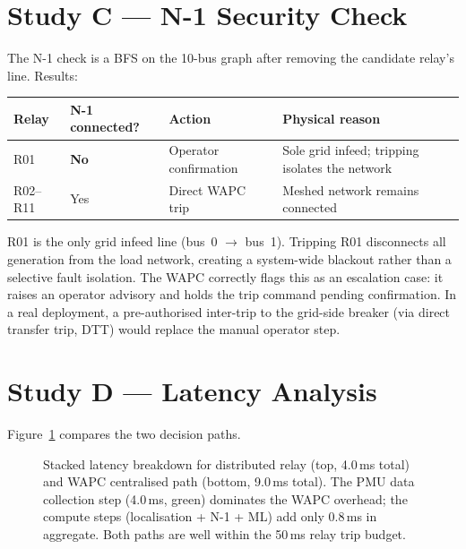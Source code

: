 \documentclass[11pt,a4paper]{article}
\begin{document}
\section{Study C --- N-1 Security Check}
\label{sec:studyC}

The N-1 check is a BFS on the 10-bus graph after removing the candidate
relay's line.  Results:

\begin{center}
\begin{tabular}{@{}llll@{}}
\toprule
Relay & N-1 connected? & Action & Physical reason \\
\midrule
R01 & \textbf{No} & Operator confirmation & Sole grid infeed; tripping isolates the network \\
R02--R11 & Yes & Direct WAPC trip & Meshed network remains connected \\
\bottomrule
\end{tabular}
\end{center}

\medskip\noindent
R01 is the only grid infeed line (bus~0 $\to$ bus~1).  Tripping R01 disconnects
all generation from the load network, creating a system-wide blackout rather
than a selective fault isolation.  The WAPC correctly flags this as an
escalation case: it raises an operator advisory and holds the trip command
pending confirmation.  In a real deployment, a pre-authorised inter-trip to
the grid-side breaker (via direct transfer trip, DTT) would replace the manual
operator step.

\section{Study D --- Latency Analysis}
\label{sec:studyD}

Figure~\ref{fig:latency} compares the two decision paths.

\begin{figure}[htbp]
  \centering
  \resizebox{0.96\textwidth}{!}{}
  \caption{Stacked latency breakdown for distributed relay (top, 4.0\,ms
           total) and WAPC centralised path (bottom, 9.0\,ms total).  The
           PMU data collection step (4.0\,ms, green) dominates the WAPC
           overhead; the compute steps (localisation + N-1 + ML) add only
           0.8\,ms in aggregate.  Both paths are well within the 50\,ms relay
           trip budget.}
  \label{fig:latency}
\end{figure}
\end{document}
